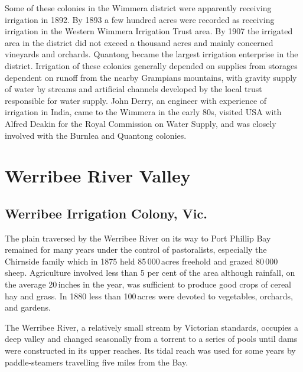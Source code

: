 Some of these colonies in the Wimmera district were apparently
receiving irrigation in 1892.  By 1893 a few hundred acres were
recorded as receiving irrigation in the Western Wimmera Irrigation
Trust area.  By 1907 the
irrigated area in the district did not exceed a thousand acres and
mainly concerned vineyards and orchards. Quantong became the largest
irrigation enterprise in the district.  Irrigation of these colonies
generally depended on supplies from storages dependent on runoff from
the nearby Grampians mountains, with gravity supply of water by
streams and artificial channels developed by the local trust
responsible for water supply. John Derry,  an
engineer with experience of irrigation in India, came to the Wimmera
in the early 80s, visited USA with Alfred Deakin for the Royal
Commission on Water Supply, and was closely involved with the Burnlea
and Quantong colonies.

\section*{Werribee River Valley}

\subsection*{Werribee Irrigation Colony, Vic.}
 

The plain traversed by the Werribee River on its way to Port Phillip
Bay remained for many years under the control of pastoralists,
especially the Chirnside family which in 1875 held 85\,000\,acres
freehold and grazed 80\,000 sheep.  Agriculture involved less than 5
per cent of the area although rainfall, on the average 20\,inches in
the year, was sufficient to produce good crops of cereal hay and
grass.  In 1880 less than 100\,acres were devoted to vegetables,
orchards, and gardens.

The Werribee River, a relatively small stream by Victorian standards,
occupies a deep valley and changed seasonally from a torrent to a
series of pools until dams were constructed in its upper reaches.  Its
tidal reach was used for some years by paddle-steamers
 travelling five
miles from the Bay.

